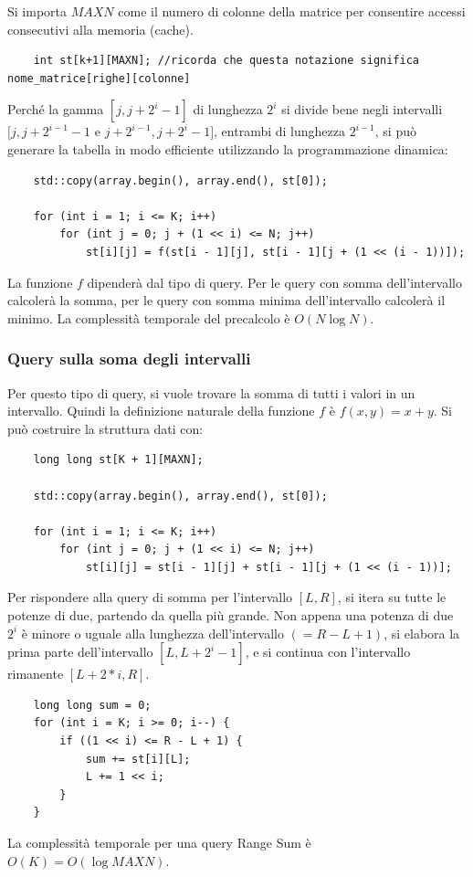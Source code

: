 \documentclass[italian,10pt,a4paper]{article}
\begin{document}
Si importa $MAXN$ come il numero di colonne della matrice per consentire accessi consecutivi alla memoria (cache).
\begin{lstlisting}
	int st[k+1][MAXN]; //ricorda che questa notazione significa nome_matrice[righe][colonne]
\end{lstlisting} 
Perché la gamma $[j, j+2^i-1]$ di lunghezza $2^i$ si divide bene negli intervalli $[j,j+2^{i-1}-1$ e $j+2^{i-1}, j+2^i-1]$, entrambi di lunghezza $2^{i-1}$, si può generare la tabella in modo efficiente utilizzando la programmazione dinamica:
\begin{lstlisting}
	std::copy(array.begin(), array.end(), st[0]);
	
	for (int i = 1; i <= K; i++)
		for (int j = 0; j + (1 << i) <= N; j++)
			st[i][j] = f(st[i - 1][j], st[i - 1][j + (1 << (i - 1))]);
\end{lstlisting}
La funzione $f$ dipenderà dal tipo di query. Per le query con somma dell'intervallo calcolerà la somma, per le query con somma minima dell'intervallo calcolerà il minimo. La complessità temporale del precalcolo è $O(N\log N)$.

\subsubsection{Query sulla soma degli intervalli}
Per questo tipo di query, si vuole trovare la somma di tutti i valori in un intervallo. Quindi la definizione naturale della funzione $f$ è $f(x,y)=x+y$. Si può costruire la struttura dati con:
\begin{lstlisting}
	long long st[K + 1][MAXN];
	
	std::copy(array.begin(), array.end(), st[0]);
	
	for (int i = 1; i <= K; i++)
		for (int j = 0; j + (1 << i) <= N; j++)
			st[i][j] = st[i - 1][j] + st[i - 1][j + (1 << (i - 1))];
\end{lstlisting}
Per rispondere alla query di somma per l'intervallo $[L,R]$, si itera su tutte le potenze di due, partendo da quella più grande. Non appena una potenza di due $2^i$ è minore o uguale alla lunghezza dell'intervallo $(=R-L+1)$, si elabora la prima parte dell'intervallo $[L,L+2^i-1]$, e si continua con l'intervallo rimanente $[L+2*i,R]$.

\begin{lstlisting}
	long long sum = 0;
	for (int i = K; i >= 0; i--) {
		if ((1 << i) <= R - L + 1) {
			sum += st[i][L];
			L += 1 << i;
		}
	}
\end{lstlisting}
La complessità temporale per una query Range Sum è $O(K)=O(\log MAXN)$.
\end{document}
